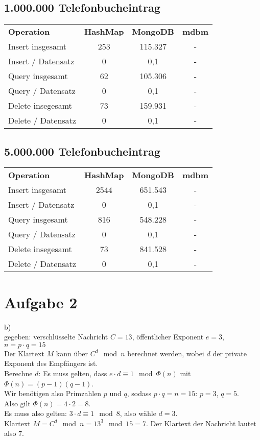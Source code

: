 \documentclass[a4paper]{scrartcl}
\begin{document}
\subsection*{1.000.000 Telefonbucheintrag} 
\begin{tabular}{lccc}
\textbf{Operation} & \textbf{HashMap}  & \textbf{MongoDB}  & \textbf{mdbm} 	\\
Insert insgesamt &  253 & 115.327 & - \\
Insert / Datensatz & 0 & 0,1 & - \\
Query insgesamt & 62  & 105.306   & - \\
Query / Datensatz & 0 & 0,1 & - \\
Delete insegesamt & 73 & 159.931   & - \\
Delete / Datensatz & 0 & 0,1 & -
\end{tabular}


\subsection*{5.000.000 Telefonbucheintrag} 
\begin{tabular}{lccc}
\textbf{Operation} & \textbf{HashMap}  & \textbf{MongoDB}  & \textbf{mdbm} 	\\
Insert insgesamt &  2544  & 651.543   & - \\
Insert / Datensatz & 0 & 0,1 & - \\
Query insgesamt & 816  & 548.228   & - \\
Query / Datensatz & 0 & 0,1 & - \\
Delete insegesamt & 73 & 841.528   & - \\
Delete / Datensatz & 0 & 0,1 & -
\end{tabular}

\section*{Aufgabe 2}
b)\\
gegeben: verschlüsselte Nachricht $C=13$,  öffentlicher Exponent $e=3$, $n=p\cdot q=15$\\

Der Klartext $M$ kann über $C^d \mod n$ berechnet werden, wobei $d$ der private Exponent des Empfängers ist.\\
Berechne $d$: Es muss gelten, dass $e\cdot d \equiv 1 \mod \Phi(n)$ mit $\Phi(n) = (p-1)(q-1)$.\\
Wir benötigen also Primzahlen $p$ und $q$, sodass $p\cdot q = n = 15$: $p=3$, $q=5$.\\
Also gilt $\Phi(n)=4\cdot2=8$.\\
Es muss also gelten: $3\cdot d\equiv1\mod8$, also wähle $d=3$.\\
Klartext $M=C^d \mod n =13^3\mod 15 = 7$.
Der Klartext der Nachricht lautet also $7$.
\end{document}
